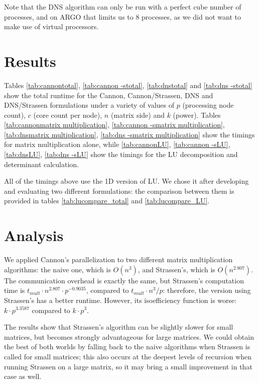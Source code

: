 \documentclass{article}
\begin{document}
Note that the DNS algorithm can only be run with a perfect cube number of processes, and
on ARGO that limits us to 8 processes, as we did not want to make use of virtual processors.

\section{Results}

Tables \ref{tab:cannontotal}, \ref{tab:cannon -stotal}, \ref{tab:dnstotal} and \ref{tab:dns -stotal} show the total runtime for the Cannon, Cannon/Strassen, DNS and DNS/Strassen formulations under a variety of values of $p$ (processing node count), $c$ (core count per node), $n$ (matrix side) and $k$ (power). Tables \ref{tab:cannonmatrix multiplication}, \ref{tab:cannon -smatrix multiplication}, \ref{tab:dnsmatrix multiplication}, \ref{tab:dns -smatrix multiplication} show the timings for matrix multiplication alone, while \ref{tab:cannonLU}, \ref{tab:cannon -sLU}, \ref{tab:dnsLU}, \ref{tab:dns -sLU} show the timings for the LU decomposition and determinant calculation.

All of the timings above use the 1D version of LU. We chose it after developing and evaluating two different formulations: the comparison between them is provided in tables \ref{tab:lucompare_total} and \ref{tab:lucompare_LU}.

\clearpage

\clearpage

\section{Analysis}

We applied Cannon's parallelization to two different matrix multiplication algorithms: the naive one, which is $O(n^3)$, and Strassen's, which is $O(n^{2.807})$. The communication overhead is exactly the same, but Strassen's computation time is $t_{{mult}} \cdot n^{2.807} \cdot  p^{-0.9035}$, compared to $t_{mult} \cdot n^3 / p$: therefore, the version using Strassen's has a better runtime. However, its isoefficiency function is worse: $k \cdot p^{3.3587}$ compared to $k \cdot p^3$.

The results show that Strassen's algorithm can be slightly slower for small matrices, but becomes strongly advantageous for large matrices. We could obtain the best of both worlds by falling back to the naive algorithms when Strassen is called for small matrices; this also occurs at the deepest levels of recursion when running Strassen on a large matrix, so it may bring a small improvement in that case as well.
\end{document}
